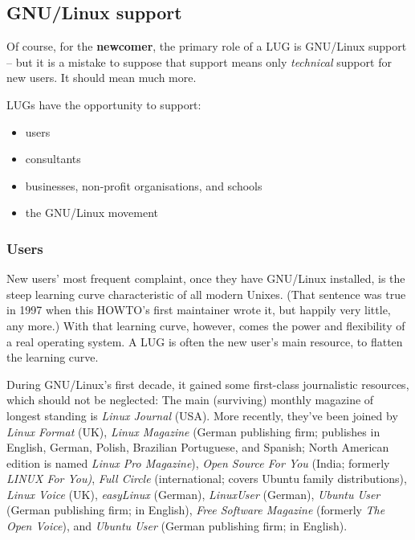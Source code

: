 \documentclass{HOWTO}
\begin{document}
\subsection{GNU/Linux support}

Of course, for the {\bfseries newcomer}, the primary role of a
LUG is GNU/Linux support -- but it is a mistake to suppose that 
support means only {\itshape technical\/} support for new users. It
should mean much more.

LUGs have the opportunity to support:

\begin{itemize}
\item users
\item consultants
\item businesses, non-profit organisations, and schools
\item the GNU/Linux movement
\end{itemize}





\subsubsection{Users}

New users' most frequent complaint, once they have GNU/Linux
installed, is the steep learning curve characteristic of all modern 
Unixes. (That sentence was true in 1997 when this HOWTO's first
maintainer wrote it, but happily very little, any more.)  With that learning
curve, however, comes the power and flexibility of a real operating
system. A LUG is often the new user's main resource, to flatten the
learning curve.

During GNU/Linux's first decade, it gained some first-class journalistic 
resources, which should not be neglected:  The main (surviving) monthly 
magazine of longest standing is {\itshape 
\emph{Linux Journal} \texttt{\acpurl}
\/} (USA).
More recently, 
they've been joined by 
{\itshape 
\emph{Linux Format} \texttt{\acqurl}
\/} (UK),
{\itshape 
\emph{Linux Magazine} \texttt{\acrurl}
\/} (German publishing firm; publishes in English, German, Polish, Brazilian Portuguese, and Spanish; North American edition is named {\itshape Linux Pro Magazine\/}),
{\itshape 
\emph{Open Source For You} \texttt{\acsurl}
\/} (India; formerly {\itshape LINUX For You)\/},
{\itshape 
\emph{Full Circle} \texttt{\acturl}
\/} (international; covers Ubuntu family distributions), 
{\itshape 
\emph{Linux Voice} \texttt{\acuurl}
\/} (UK), 
{\itshape 
\emph{easyLinux} \texttt{\acvurl}
\/} (German),
{\itshape 
\emph{LinuxUser} \texttt{\acwurl}
\/} (German), 
{\itshape 
\emph{Ubuntu User} \texttt{\acxurl}
\/} (German
publishing firm; in English), 
{\itshape 
\emph{Free Software Magazine} \texttt{\acyurl}
\/} (formerly {\itshape The Open Voice\/}), and
{\itshape 
\emph{Ubuntu User} \texttt{\aczurl}
\/} (German publishing firm; in English).
\end{document}

